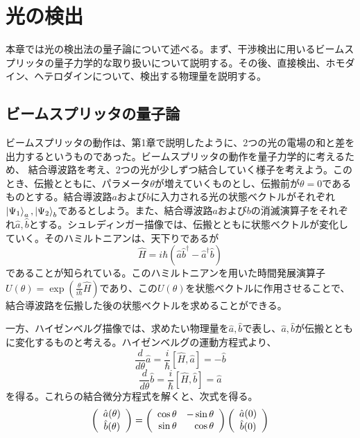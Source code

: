 \chapter{光の検出}

本章では光の検出法の量子論について述べる。まず、干渉検出に用いるビームスプリッタの量子力学的な取り扱いについて説明する。その後、直接検出、ホモダイン、ヘテロダインについて、検出する物理量を説明する。

\section{ビームスプリッタの量子論}

ビームスプリッタの動作は、第1章で説明したように、2つの光の電場の和と差を出力するというものであった。ビームスプリッタの動作を量子力学的に考えるため、
結合導波路を考え、2つの光が少しずつ結合していく様子を考えよう。このとき、伝搬とともに、パラメータ$\theta$が増えていくものとし、伝搬前が$\theta = 0$であるものとする。結合導波路$a$および$b$に入力される光の状態ベクトルがそれぞれ$\ket {\Psi_1}_a, \ket {\Psi_2}_b$であるとしよう。また、結合導波路$a$および$b$の消滅演算子をそれぞれ$\hat a, \hat b$とする。シュレディンガー描像では、伝搬とともに状態ベクトルが変化していく。そのハミルトニアンは、天下りであるが
\begin{equation}
  \hat H = i\hbar (\hat a \hat b^\dagger - \hat a^\dagger \hat b)
\end{equation}
であることが知られている。このハミルトニアンを用いた時間発展演算子$U(\theta) = \exp\left( \frac{\theta}{i\hbar} \hat H\right)$であり、この$U(\theta)$を状態ベクトルに作用させることで、結合導波路を伝搬した後の状態ベクトルを求めることができる。

一方、ハイゼンベルグ描像では、求めたい物理量を$\hat a, \hat b$で表し、$\hat a, \hat b$が伝搬とともに変化するものと考える。ハイゼンベルグの運動方程式より、
\begin{equation}
  \frac{d}{d\theta}\hat a = \frac{i}{\hbar}[\hat H, \hat a] = -\hat b
\end{equation}
\begin{equation}
  \frac{d}{d\theta}\hat b = \frac{i}{\hbar}[\hat H, \hat b] = \hat a
\end{equation}
を得る。これらの結合微分方程式を解くと、次式を得る。
\begin{equation}
  \left(\begin{array}{c}
  	\hat a(\theta) \\ \hat b(\theta)
  \end{array} \right) = \left(
  \begin{array}{r r}
  	\cos \theta & -\sin \theta \\
  	\sin \theta & \cos \theta
  \end{array}
  \right)
  \left(\begin{array}{c}
  	\hat a(0) \\ \hat b(0)
  \end{array}\right)
\end{equation}

